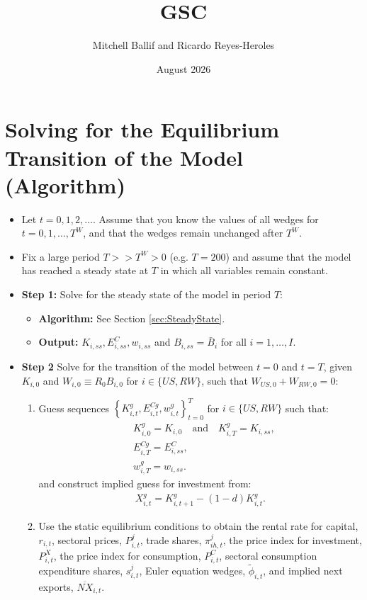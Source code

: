 \documentclass{article}
\title{GSC}
\author{Mitchell Ballif and Ricardo Reyes-Heroles}
\date{August 2026}
\begin{document}
\maketitle

\section{Solving for the Equilibrium Transition of the Model (Algorithm)}
\begin{itemize}
    \item Let $t=0,1,2,\ldots$. {\color{blue}Assume that you know the values of all wedges for $t=0,1,\ldots,T^{W}$, and that the wedges remain unchanged after $T^{W}$}.
    \item Fix a large period $T>>T^{W}>0$ (e.g. $T=200$) and assume that the model has reached a steady state at $T$ in which all variables remain constant.
    \item \textbf{Step 1:} Solve for the steady state of the model in period $T$:
    \begin{itemize}
        \item \textbf{Algorithm:} See Section \ref{sec:SteadyState}.
        \item \textbf{Output:} {\color{blue}$K_{i,ss},E_{i,ss}^{C},w_{i,ss}$ and $B_{i,ss} = \bar{B}_{i}$ for all $i=1,\ldots,I$.}
    \end{itemize}
    \item \textbf{Step 2} Solve for the transition of the model between $t=0$ and $t=T$, given $K_{i,0}$ and $W_{i,0} \equiv R_{0}B_{i,0}$ for $i \in \{US,RW\}$, such that $W_{US,0} + W_{RW,0} = 0 $:
    \begin{enumerate}
        \item Guess sequences $\left\{ K_{i,t}^{g}, E_{i,t}^{Cg}, w_{i,t}^{g} \right\}_{t=0}^{T}$ for $i \in \{ US, RW \}$ such that:
        \begin{align*}
            & K_{i,0}^{g} = K_{i,0} \text{~~~and~~~} K_{i,T}^{g} = K_{i,ss}, \\
            & E_{i,T}^{Cg} = E_{i,ss}^{C}, \\
            & w_{i,T}^{g} = w_{i,ss}.
        \end{align*}
        and construct implied guess for investment from:
        \begin{align*}
            X_{i,t}^{g} = K_{i,t+1}^{g} - (1-d) K_{i,t}^{g}.
        \end{align*}

        \item Use the static equilibrium conditions to obtain the rental rate for capital, $r_{i,t}$, sectoral prices, $P_{i,t}^{j}$, trade shares, $\pi_{ih,t}^{j}$, the price index for investment, $P_{i,t}^{X}$, the price index for consumption, $P_{i,t}^{C}$, sectoral consumption expenditure shares, $s_{i,t}^{j}$, Euler equation wedges, $\widetilde{\phi}_{i,t}$, and implied next exports, $\overline{NX}_{i,t}$.


\end{enumerate}
\end{itemize}
\end{document}
